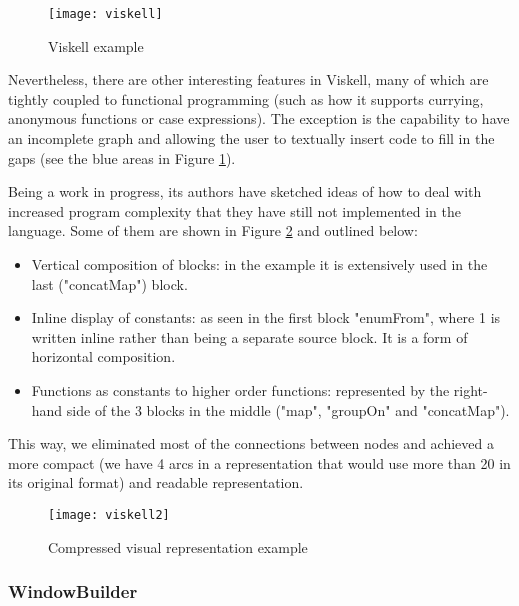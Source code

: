 \begin{figure}[t]
  \begin{center}
    \leavevmode
    \texttt{[image: viskell]}
    \caption{Viskell example \cite{viskell}}
    \label{fig:viskell}
  \end{center}
\end{figure}

Nevertheless, there are other interesting features in Viskell, many of which
are tightly coupled to functional programming (such as how it supports currying,
anonymous functions or case expressions). The exception is the capability to
have an incomplete graph and allowing the user to textually insert code to fill
in the gaps (see the blue areas in Figure \ref{fig:viskell}).

Being a work in progress, its authors have sketched ideas of how to deal with
increased program complexity that they have still not implemented in the language.
Some of them are shown in Figure \ref{fig:viskell2} and outlined below:

\begin{itemize}
  \item Vertical composition of blocks: in the example it is extensively used
in the last ("concatMap") block.
  \item Inline display of constants: as seen in the first block "enumFrom",
where 1 is written inline rather than being a separate source block. It is a form
of horizontal composition.
  \item Functions as constants to higher order functions: represented by the
right-hand side of the 3 blocks in the middle ("map", "groupOn" and "concatMap").
\end{itemize}

This way, we eliminated most of the connections between nodes and achieved a
more compact (we have 4 arcs in a representation that would use more than 20 in
its original format) and readable representation.

\begin{figure}[t]
  \begin{center}
    \leavevmode
    \texttt{[image: viskell2]}
    \caption{Compressed visual representation example \cite{viskell}}
    \label{fig:viskell2}
  \end{center}
\end{figure}

\subsubsection{WindowBuilder}
\label{sec:winb}

